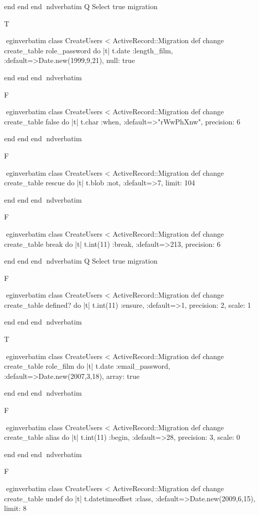     end 
  end 
end
nd{verbatim}
Q
 Select true migration

T

egin{verbatim}
 class CreateUsers < ActiveRecord::Migration 
  def change 
    create_table role_password do |t| 
      t.date :length_film, :default=>Date.new(1999,9,21), null: true
    
    end 
  end 
end
nd{verbatim}

F

egin{verbatim}
 class CreateUsers < ActiveRecord::Migration 
  def change 
    create_table false do |t| 
      t.char :when, :default=>"rWwPhXnw", precision: 6
    
    end 
  end 
end
nd{verbatim}

F

egin{verbatim}
 class CreateUsers < ActiveRecord::Migration 
  def change 
    create_table rescue do |t| 
      t.blob :not, :default=>7, limit: 104
    
    end 
  end 
end
nd{verbatim}

F

egin{verbatim}
 class CreateUsers < ActiveRecord::Migration 
  def change 
    create_table break do |t| 
      t.int(11) :break, :default=>213, precision: 6
    
    end 
  end 
end
nd{verbatim}
Q
 Select true migration

F

egin{verbatim}
 class CreateUsers < ActiveRecord::Migration 
  def change 
    create_table defined? do |t| 
      t.int(11) :ensure, :default=>1, precision: 2, scale: 1
    
    end 
  end 
end
nd{verbatim}

T

egin{verbatim}
 class CreateUsers < ActiveRecord::Migration 
  def change 
    create_table role_film do |t| 
      t.date :email_password, :default=>Date.new(2007,3,18), array: true
    
    end 
  end 
end
nd{verbatim}

F

egin{verbatim}
 class CreateUsers < ActiveRecord::Migration 
  def change 
    create_table alias do |t| 
      t.int(11) :begin, :default=>28, precision: 3, scale: 0
    
    end 
  end 
end
nd{verbatim}

F

egin{verbatim}
 class CreateUsers < ActiveRecord::Migration 
  def change 
    create_table undef do |t| 
      t.datetimeoffset :class, :default=>Date.new(2009,6,15), limit: 8
    
